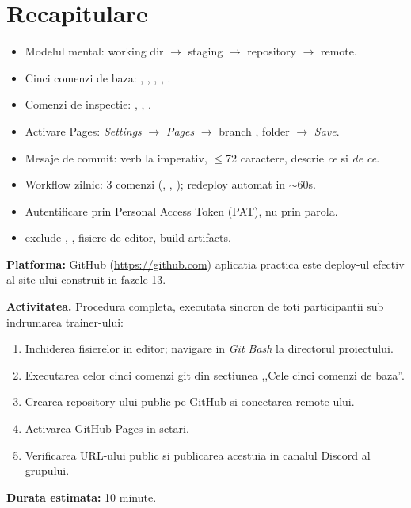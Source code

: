 \section*{Recapitulare}

\begin{recap}
\begin{itemize}[itemsep=1pt]
  \item Modelul mental: working dir $\to$ staging $\to$ repository $\to$ remote.
  \item Cinci comenzi de baza: , , , , .
  \item Comenzi de inspectie: , , .
  \item Activare Pages: \emph{Settings} $\to$ \emph{Pages} $\to$ branch , folder  $\to$ \emph{Save}.
  \item Mesaje de commit: verb la imperativ, $\leq$72 caractere, descrie \emph{ce} si \emph{de ce}.
  \item Workflow zilnic: 3 comenzi (, , ); redeploy automat in $\sim$60s.
  \item Autentificare prin Personal Access Token (PAT), nu prin parola.
  \item {} exclude , , fisiere de editor, build artifacts.
\end{itemize}
\end{recap}

\partdivider

\begin{joc}
\textbf{Platforma:} GitHub (\url{https://github.com}) \textendash{} aplicatia practica este deploy-ul efectiv al site-ului construit in fazele 1\textendash{}3.

\medskip

\textbf{Activitatea.} Procedura completa, executata sincron de toti participantii sub indrumarea trainer-ului:
\begin{enumerate}[itemsep=1pt]
  \item Inchiderea fisierelor in editor; navigare in \emph{Git Bash} la directorul proiectului.
  \item Executarea celor cinci comenzi git din sectiunea ,,Cele cinci comenzi de baza''.
  \item Crearea repository-ului public pe GitHub si conectarea remote-ului.
  \item Activarea GitHub Pages in setari.
  \item Verificarea URL-ului public si publicarea acestuia in canalul Discord al grupului.
\end{enumerate}

\textbf{Durata estimata:} 10 minute.
\end{joc}

